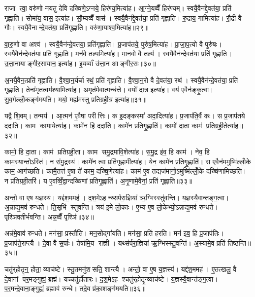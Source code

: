 राजा त्वा॒ वरु॑णो नयतु देवि दख्षिणे॒ऽग्नये॒ हिर॑ण्य॒मित्या॑ह। आ॒ग्ने॒यव्वैँ हिर॑ण्यम्। स्वयै॒वैन॑द्दे॒वत॑या॒ प्रति॑ गृह्णाति। सोमा॑य॒ वास॒ इत्या॑ह। सौ॒म्यव्वैँ वास॑। स्वयै॒वैन॑द्दे॒वत॑या॒ प्रति॑ गृह्णाति। रु॒द्राय॒ गामित्या॑ह। रौ॒द्री वै गौः। स्वयै॒वैनान्दे॒वत॑या॒ प्रति॑गृह्णाति। वरु॑णा॒याश्व॒मित्या॑ह॥२९॥

वा॒रु॒णो वा अश्व॑। स्वयै॒वैन॑न्दे॒वत॑या॒ प्रति॑गृह्णाति। प्र॒जाप॑तये॒ पुरु॑ष॒मित्या॑ह। प्रा॒जा॒प॒त्यो वै पुरु॑षः। स्वयै॒वैन॑न्दे॒वत॑या॒ प्रति॑ गृह्णाति। मन॑वे॒ तल्प॒मित्या॑ह। मा॒न॒वो वै तल्प॑। स्वयै॒वैन॑न्दे॒वत॑या॒ प्रति॑ गृह्णाति। उ॒त्ता॒नायाङ्गीर॒सायान॒ इत्या॑ह। इ॒यव्वाँ उ॑त्ता॒न आङ्गीर॒सः॥३०॥

अ॒नयै॒वैन॒त्प्रति॑ गृह्णाति। वै॒श्वा॒न॒र्यर्चा रथं॒ प्रति॑ गृह्णाति। वै॒श्वा॒न॒रो वै दे॒वत॑या॒ रथ॑। स्वयै॒वैन॑न्दे॒वत॑या॒ प्रति॑ गृह्णाति। तेना॑मृत॒त्वम॑श्या॒मित्या॑ह। अ॒मृत॑मे॒वात्मन्ध॑त्ते। वयो॑ दा॒त्र इत्या॑ह। वय॑ ए॒वैन॑ङ्कृ॒त्वा। सु॒व॒र्गल्लोँ॒कङ्ग॑मयति। मयो॒ मह्य॑मस्तु प्रतिग्रही॒त्र इत्या॑ह॥३१॥

यद्वै शि॒वम्। तन्मय॑। आ॒त्मन॑ ए॒वैषा परीत्तिः। क इ॒दङ्कस्मा॑ अदा॒दित्या॑ह। प्र॒जाप॑ति॒र्वै कः। स प्र॒जाप॑तये ददाति। काम॒ कामा॒येत्या॑ह। कामे॑न॒ हि ददा॑ति। कामे॑न प्रतिगृ॒ह्णाति॑। कामो॑ दा॒ता काम॑ प्रतिग्रही॒तेत्या॑ह॥३२॥

कामो॒ हि दा॒ता। काम॑ प्रतिग्रही॒ता। काम समु॒द्रमावि॒शेत्या॑ह। स॒मु॒द्र इ॑व॒ हि काम॑। नेव॒ हि काम॒स्यान्तोऽस्ति॑। न स॑मु॒द्रस्य॑। कामे॑न त्वा॒ प्रति॑गृह्णा॒मीत्या॑ह। येन॒ कामे॑न प्रतिगृ॒ह्णाति॑। स ए॒वैन॑म॒मुष्मि॑ल्लोँ॒के काम॒ आग॑च्छति। कामै॒तत्त॑ ए॒षा ते॑ काम॒ दख्षि॒णेत्या॑ह। काम॑ ए॒व तद्यज॑मानो॒ऽमुष्मि॑ल्लोँ॒के दख्षि॑णामिच्छति। न प्र॑तिग्रही॒तरि॑। य ए॒वव्विँ॒द्वान्दख्षि॑णां प्रतिगृ॒ह्णाति॑। अ॒नृ॒णामे॒वैनां॒ प्रति॑ गृह्णाति॥३३॥\anuvakamend[व्ली॒ना॒त्यश्व॒मित्या॑हाङ्गीर॒सः प्र॑तिग्रही॒त्र इत्या॑ह प्रतिग्रही॒तेत्या॑ह॒ दख्षि॒णेत्या॑ह च॒त्वारि॑ च]

अन्तो॒ वा ए॒ष य॒ज्ञस्य॑। यद्द॑श॒ममह॑। द॒श॒मेऽहन्थ्सर्परा॒ज्ञिया॑ ऋ॒ग्भिस्स्तु॑वन्ति। य॒ज्ञस्यै॒वान्त॑ङ्ग॒त्वा। अ॒न्नाद्य॒मव॑ रुन्धते। ति॒सृभि॑ स्तुवन्ति। त्रय॑ इ॒मे लो॒काः। ए॒भ्य ए॒व लो॒केभ्यो॒ऽन्नाद्य॒मव॑ रुन्धते। पृश्ञि॑वतीर्भवन्ति। अन्न॒व्वैँ पृश्ञि॑॥३४॥

अन्न॑मे॒वाव॑ रुन्धते। मन॑सा॒ प्रस्तौ॑ति। मन॒सोद्गा॑यति। मन॑सा॒ प्रति॑ हरति। मन॑ इव॒ हि प्र॒जाप॑तिः। प्र॒जाप॑ते॒राप्त्यै। दे॒वा वै स॒र्पाः। तेषा॑मि॒य राज्ञी। यथ्स॑र्परा॒ज्ञिया॑ ऋ॒ग्भिस्स्तु॒वन्ति॑। अ॒स्यामे॒व प्रति॑ तिष्ठन्ति॥३५॥

चतु॑र्‌होतॄ॒न्॒ होता॒ व्याच॑ष्टे। स्तु॒तमनु॑शसति॒ शान्त्यै। अन्तो॒ वा ए॒ष य॒ज्ञस्य॑। यद्द॑श॒ममह॑। ए॒तत्खलु॒ वै दे॒वानां पर॒मङ्गुह्यं॒ ब्रह्म॑। यच्चतु॑र्होतारः। द॒श॒मेऽह॒ श्चतु॑र्‌होतॄ॒न्व्याच॑ष्टे। य॒ज्ञस्यै॒वान्त॑ङ्ग॒त्वा। प॒र॒मन्दे॒वाना॒ङ्गुह्यं॒ ब्रह्माव॑ रुन्धे। तदे॒व प्र॑का॒शङ्ग॑मयति॥३६॥

